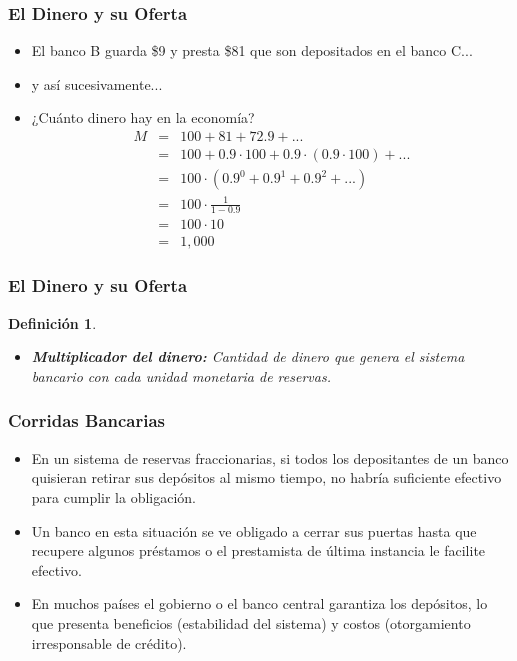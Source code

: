\documentclass[dvipsnames,table,leqno]{beamer}
\newtheorem{mydef}{Definición}
\newcommand{\peq}[1]{{\scriptscriptstyle{#1}}}
\newcommand{\rp}[1]{\left(#1\right)}
\begin{document}
		\begin{frame}
			\frametitle{El Dinero y su Oferta}
			\begin{itemize}
				\item El banco B guarda \$9 y presta \$81 que son depositados en el banco C...
				\item y así sucesivamente...
				\item ¿Cuánto dinero hay en la economía? 
							$$\begin{array}{lll}
									M&=&100+81+72.9+...\\ [1ex]
									 &=&100+0.9\cdot100+0.9\cdot\rp{0.9\cdot100}+...\\ [1ex]
									 &=&100\cdot\rp{0.9^\peq{0}+0.9^\peq{1}+0.9^\peq{2}+...}\\ [1ex]
									 &=&100\cdot\frac{1}{1-0.9}\\ [1ex]
									 &=&100\cdot10\\ [1ex]
									 &=&1,000									 
								\end{array}$$
			\end{itemize}
		\end{frame}	

		\begin{frame}
			\frametitle{El Dinero y su Oferta}
			\begin{mydef}
				\begin{itemize}
					\item \textbf{Multiplicador del dinero:} Cantidad de dinero que genera el sistema bancario con cada unidad monetaria de reservas.
				\end{itemize}
			\end{mydef}
		\end{frame}

		\begin{frame}
			\frametitle{Corridas Bancarias}
			\begin{itemize}
				\item En un sistema de reservas fraccionarias, si todos los depositantes de un banco quisieran retirar sus depósitos al mismo tiempo, no habría suficiente efectivo para cumplir la obligación.
				\item Un banco en esta situación se ve obligado a cerrar sus puertas hasta que recupere algunos préstamos o el prestamista de última instancia le facilite efectivo.
				\item En muchos países el gobierno o el banco central garantiza los depósitos, lo que presenta beneficios (estabilidad del sistema) y costos (otorgamiento irresponsable de crédito).
			\end{itemize}
		\end{frame}
\end{document}
